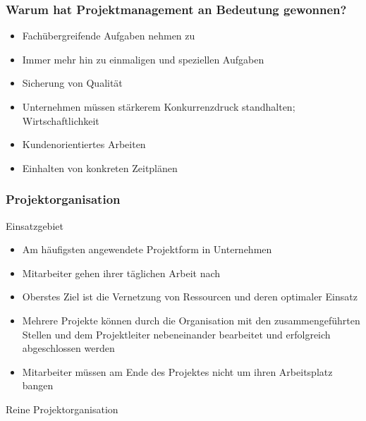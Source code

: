 \subsubsection{Warum hat Projektmanagement an Bedeutung gewonnen?}
\begin{itemize}
	\itemsep0em
	\item Fachübergreifende Aufgaben nehmen zu
	\item Immer mehr hin zu einmaligen und speziellen Aufgaben
	\item Sicherung von Qualität
	\item Unternehmen müssen stärkerem Konkurrenzdruck standhalten; Wirtschaftlichkeit
	\item Kundenorientiertes Arbeiten
	\item Einhalten von konkreten Zeitplänen
\end{itemize}

\subsubsection{Projektorganisation}

Einsatzgebiet

\begin{itemize}
	\item Am häufigsten angewendete Projektform in Unternehmen
	\item Mitarbeiter gehen ihrer täglichen Arbeit nach
	\item Oberstes Ziel ist die Vernetzung von Ressourcen und deren optimaler Einsatz
	\item Mehrere Projekte können durch die Organisation mit den zusammengeführten Stellen und dem Projektleiter nebeneinander bearbeitet und erfolgreich abgeschlossen werden
	\item Mitarbeiter müssen am Ende des Projektes nicht um ihren Arbeitsplatz bangen
\end{itemize}

\noindent Reine Projektorganisation

